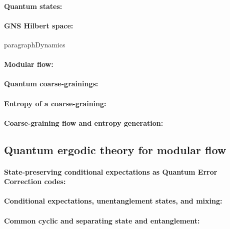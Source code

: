 \documentclass[a4paper,11pt]{article}
\theoremstyle{definition}
\begin{document}
\paragraph{Quantum states:}

\paragraph{GNS Hilbert space:}

paragraph{Dynamics}

\paragraph{Modular flow:}

\paragraph{Quantum coarse-grainings:}

\paragraph{Entropy of a coarse-graining:}

\paragraph{Coarse-graining flow and entropy generation:}



\subsection{Quantum ergodic theory for modular flow}

\paragraph{State-preserving conditional expectations as Quantum Error Correction codes:}

\paragraph{Conditional expectations, unentanglement states, and mixing:}

\paragraph{Common cyclic and separating state and entanglement:}
\end{document}
